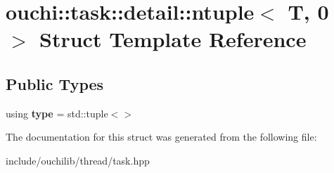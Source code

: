 \hypertarget{structouchi_1_1task_1_1detail_1_1ntuple_3_01_t_00_010_01_4}{}\section{ouchi\+::task\+::detail\+::ntuple$<$ T, 0 $>$ Struct Template Reference}
\label{structouchi_1_1task_1_1detail_1_1ntuple_3_01_t_00_010_01_4}
\subsection*{Public Types}
\begin{DoxyCompactItemize}
\item 
\mbox{\label{structouchi_1_1task_1_1detail_1_1ntuple_3_01_t_00_010_01_4_a714033798f7a9f948376ff2e6382dd54}} 
using {\bfseries type} = std\+::tuple$<$$>$
\end{DoxyCompactItemize}


The documentation for this struct was generated from the following file\+:\begin{DoxyCompactItemize}
\item 
include/ouchilib/thread/task.\+hpp\end{DoxyCompactItemize}
